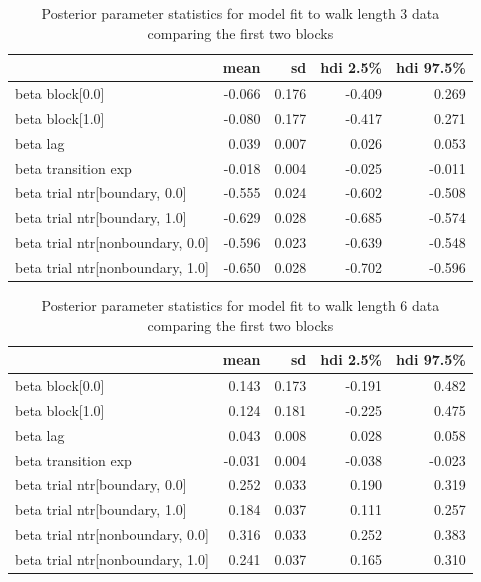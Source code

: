 \begin{table}[H]
    \centering
    \begin{tabular}{lrrrr}
        \toprule
         & mean & sd & hdi 2.5\% & hdi 97.5\% \\
        \midrule
        beta block[0.0] & -0.066 & 0.176 & -0.409 & 0.269 \\
        beta block[1.0] & -0.080 & 0.177 & -0.417 & 0.271 \\
        beta lag & 0.039 & 0.007 & 0.026 & 0.053 \\
        beta transition exp & -0.018 & 0.004 & -0.025 & -0.011 \\
        beta trial ntr[boundary, 0.0] & -0.555 & 0.024 & -0.602 & -0.508 \\
        beta trial ntr[boundary, 1.0] & -0.629 & 0.028 & -0.685 & -0.574 \\
        beta trial ntr[nonboundary, 0.0] & -0.596 & 0.023 & -0.639 & -0.548 \\
        beta trial ntr[nonboundary, 1.0] & -0.650 & 0.028 & -0.702 & -0.596 \\
        \bottomrule
        \end{tabular}        
        \caption{Posterior parameter statistics for model fit to walk length 3 data comparing the first two blocks}
        \label{tab:first-two-blocks-3}
\end{table}

\begin{table}[H]
    \centering
    \begin{tabular}{lrrrr}
        \toprule
         & mean & sd & hdi 2.5\% & hdi 97.5\% \\
        \midrule
        beta block[0.0] & 0.143 & 0.173 & -0.191 & 0.482 \\
        beta block[1.0] & 0.124 & 0.181 & -0.225 & 0.475 \\
        beta lag & 0.043 & 0.008 & 0.028 & 0.058 \\
        beta transition exp & -0.031 & 0.004 & -0.038 & -0.023 \\
        beta trial ntr[boundary, 0.0] & 0.252 & 0.033 & 0.190 & 0.319 \\
        beta trial ntr[boundary, 1.0] & 0.184 & 0.037 & 0.111 & 0.257 \\
        beta trial ntr[nonboundary, 0.0] & 0.316 & 0.033 & 0.252 & 0.383 \\
        beta trial ntr[nonboundary, 1.0] & 0.241 & 0.037 & 0.165 & 0.310 \\
        \bottomrule
    \end{tabular}
    \caption{Posterior parameter statistics for model fit to walk length 6 data comparing the first two blocks}
    \label{tab:first-two-blocks-6}
\end{table}

